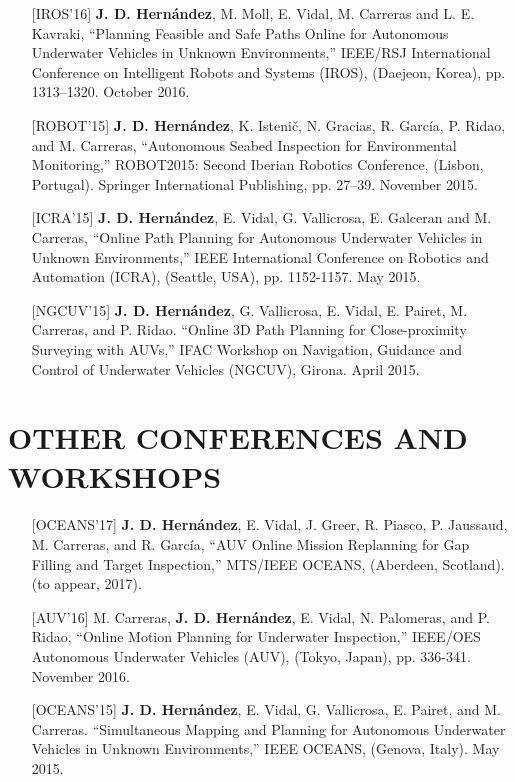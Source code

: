 \begin{itemize}
  \item[] [IROS'16] \textbf{J. D. Hern\'andez}, M. Moll, E. Vidal, M. Carreras
  and L. E. Kavraki, ``Planning Feasible and Safe Paths Online for Autonomous
  Underwater Vehicles in Unknown Environments,'' IEEE/RSJ International
  Conference on Intelligent Robots and Systems (IROS), (Daejeon, Korea), pp.
  1313–1320. October 2016.
  \item[] [ROBOT'15] \textbf{J. D. Hern\'andez}, K. Isteni\v{c}, N. Gracias, R.
  Garc\'ia, P. Ridao, and M. Carreras, ``Autonomous Seabed Inspection for
  Environmental Monitoring,'' ROBOT2015: Second Iberian Robotics Conference,
  (Lisbon, Portugal). Springer International Publishing, pp. 27–39. November
  2015.
  \item[] [ICRA'15] \textbf{J. D. Hern\'andez}, E. Vidal, G. Vallicrosa, E.
  Galceran and M. Carreras, ``Online Path Planning for Autonomous Underwater
  Vehicles in Unknown Environments,'' IEEE International Conference on Robotics
  and Automation (ICRA), (Seattle, USA), pp. 1152-1157. May 2015.
  \item[] [NGCUV'15] \textbf{J. D. Hern\'andez}, G. Vallicrosa, E. Vidal, E.
  Pairet, M. Carreras, and P. Ridao. ``Online 3D Path Planning for
  Close-proximity Surveying with AUVs,'' IFAC Workshop on Navigation, Guidance
  and Control of Underwater Vehicles (NGCUV), Girona. April 2015.
\end{itemize}

\section*{OTHER CONFERENCES AND WORKSHOPS}

\begin{itemize}
  \item[] [OCEANS'17] \textbf{J. D. Hern\'andez}, E. Vidal, J. Greer, R. Piasco,
  P. Jaussaud, M. Carreras, and R. Garc\'ia, ``AUV Online Mission Replanning for
  Gap Filling and Target Inspection,'' MTS/IEEE OCEANS, (Aberdeen, Scotland).
  (to appear, 2017).
  \item[] [AUV'16] M. Carreras, \textbf{J. D. Hern\'andez}, E. Vidal, N.
  Palomeras, and P. Ridao, ``Online Motion Planning for Underwater
  Inspection,'' IEEE/OES Autonomous Underwater Vehicles (AUV), (Tokyo, Japan),
  pp. 336-341. November 2016.
  \item[] [OCEANS'15] \textbf{J. D. Hern\'andez}, E. Vidal, G. Vallicrosa, E.
  Pairet, and M. Carreras. ``Simultaneous Mapping and Planning for Autonomous
  Underwater Vehicles in Unknown Environments,'' IEEE OCEANS, (Genova,
  Italy). May 2015.
\end{itemize}

